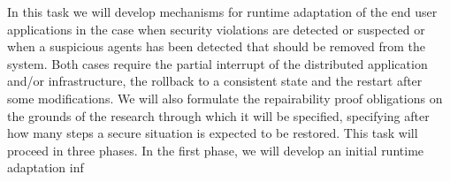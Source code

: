 \begin{Workpackage}{\thewpno}
\begin{Task}
\TaskResults{%
\ref{del:vul1},
\ref{del:vul2},
\ref{del:vul3}
}
\TaskHeader{}
In this task we will develop mechanisms for runtime adaptation of the end user applications in the case when security violations are detected or suspected or when a suspicious agents has been detected that should be removed from the system. Both cases require the partial interrupt of the distributed application and/or infrastructure, the rollback to a consistent state and the restart after some modifications. We will also formulate the repairability proof obligations on the grounds of the research through which it will be specified, specifying after how many steps a secure situation is expected to be restored. This task will proceed in three phases. In the first phase, we will develop an initial runtime adaptation inf
\end{Task}



\end{Workpackage}
